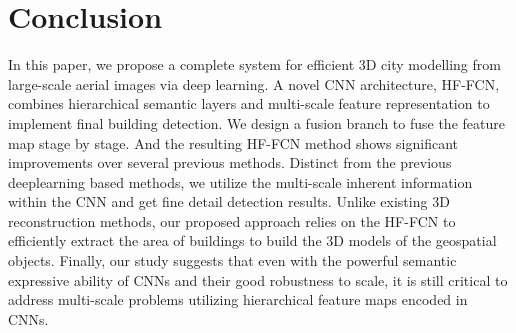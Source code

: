 \section{Conclusion}
\label{Sec:Con}
 In this paper, we propose a complete system for efficient 3D city modelling from large-scale aerial images via deep learning. A novel CNN architecture, HF-FCN, combines hierarchical semantic layers and multi-scale feature representation to implement final building detection. We design a fusion branch to fuse the feature map stage by stage. And the resulting HF-FCN method shows significant improvements over several previous methods. Distinct from the previous deeplearning based methods, we utilize the multi-scale inherent information within the CNN and get fine detail detection results. Unlike existing 3D  reconstruction methods, our proposed approach relies on the HF-FCN to efficiently extract the area of buildings to build the 3D models of the geospatial objects. Finally, our study suggests that even with the powerful semantic expressive ability of CNNs and their good robustness to scale, it is still critical to address multi-scale problems utilizing hierarchical feature maps encoded in CNNs.
 